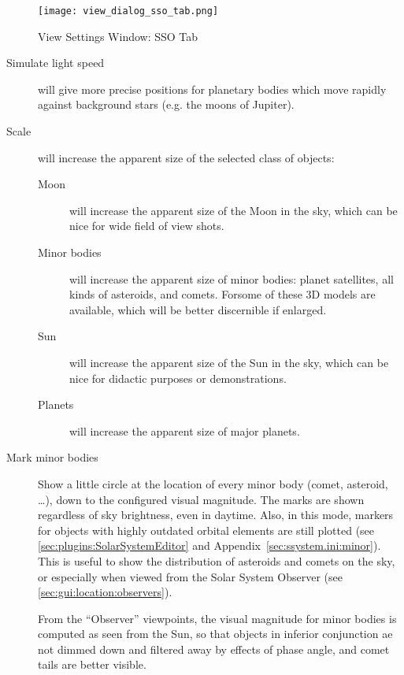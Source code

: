\begin{figure}[htbp]
\centering\texttt{[image: view\_dialog\_sso\_tab.png]}
\caption{View Settings Window: SSO Tab}
\label{fig:gui:view:sso}
\end{figure}


\begin{description}
\item[Simulate light speed] will give more precise positions for planetary bodies which move
  rapidly against background stars (e.g. the moons of Jupiter).
\item[Scale] will increase the apparent size of the selected class of objects:
  \begin{description}
  \item[Moon] will increase the apparent size of the Moon
  in the sky, which can be nice for wide field of view shots.
  \item[Minor bodies] will increase the apparent size of minor
  bodies: planet satellites, all kinds of asteroids, and comets.  
  Forsome of these 3D models are available, which will be better
  discernible if enlarged.
  \item[Sun] will increase the apparent size of the Sun
    in the sky, which can be nice for didactic purposes or demonstrations.
  \item[Planets] will increase the apparent size of major planets.
  \end{description}
\item[Mark minor bodies] Show a little circle at the location of every minor body (comet,
  asteroid, \ldots), down to the configured visual magnitude.
  The marks are shown regardless of sky brightness, even in daytime. Also, in this mode, markers for objects 
  with highly outdated orbital elements are still plotted (see \ref{sec:plugins:SolarSystemEditor} 
  and Appendix~\ref{sec:ssystem.ini:minor}). 
  This is useful to show the distribution of asteroids and comets on the sky, 
  or especially when viewed from the Solar System Observer (see \ref{sec:gui:location:observers}). 

  From the ``Observer'' viewpoints, the visual magnitude for minor bodies is computed as seen from the Sun,
  so that objects in inferior conjunction ae not dimmed down and filtered away by effects of phase angle, 
  and comet tails are better visible. 
  

\end{description}
